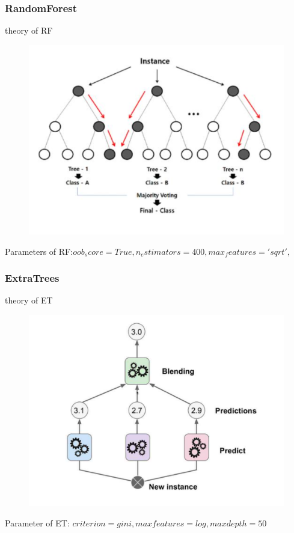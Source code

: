 \documentclass{article}
\begin{document}
\subsubsection{RandomForest}
 theory of RF
   \begin{figure}[H]
\centering
  \includegraphics[width=.8\textwidth]{3-8.png} %
  \end{figure}
Parameters of RF:$
    oob_score=True,
    n_estimators=400,
    max_features='sqrt',
    $
\subsubsection{ExtraTrees}
theory of ET
   \begin{figure}[H]
\centering
  \includegraphics[width=.8\textwidth]{3-9.png} %
  \end{figure}
 Parameter of ET:
 $
 criterion=gini,
 max features=log,
 max depth=50
 $
\end{document}
